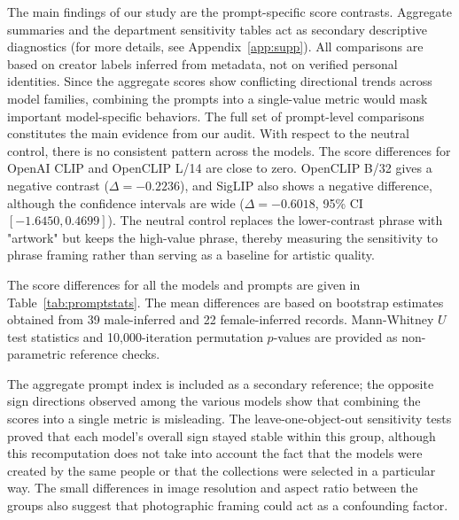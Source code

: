 \documentclass[pdflatex,sn-basic,Numbered]{sn-jnl}
\begin{document}
The main findings of our study are the prompt-specific score contrasts. Aggregate summaries and the department sensitivity tables act as secondary descriptive diagnostics (for more details, see Appendix~\ref{app:supp}). All comparisons are based on creator labels inferred from metadata, not on verified personal identities. Since the aggregate scores show conflicting directional trends across model families, combining the prompts into a single-value metric would mask important model-specific behaviors. The full set of prompt-level comparisons constitutes the main evidence from our audit. With respect to the neutral control, there is no consistent pattern across the models. The score differences for OpenAI CLIP and OpenCLIP L/14 are close to zero. OpenCLIP B/32 gives a negative contrast ($\Delta = -0.2236$), and SigLIP also shows a negative difference, although the confidence intervals are wide ($\Delta = -0.6018$, 95\% CI $[-1.6450, 0.4699]$). The neutral control replaces the lower-contrast phrase with "artwork" but keeps the high-value phrase, thereby measuring the sensitivity to phrase framing rather than serving as a baseline for artistic quality.

The score differences for all the models and prompts are given in Table~\ref{tab:promptstats}. The mean differences are based on bootstrap estimates obtained from 39 male-inferred and 22 female-inferred records. Mann-Whitney $U$ test statistics and 10,000-iteration permutation $p$-values are provided as non-parametric reference checks.

The aggregate prompt index is included as a secondary reference; the opposite sign directions observed among the various models show that combining the scores into a single metric is misleading. The leave-one-object-out sensitivity tests proved that each model's overall sign stayed stable within this group, although this recomputation does not take into account the fact that the models were created by the same people or that the collections were selected in a particular way. The small differences in image resolution and aspect ratio between the groups also suggest that photographic framing could act as a confounding factor.
\end{document}
